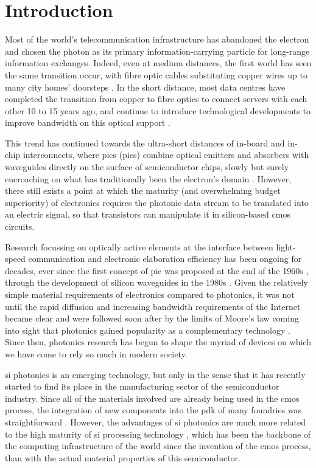 \chapter{Introduction}
\label{chap:introduction}

Most of the world's telecommunication infrastructure has abandoned the electron and chosen the photon as its primary information-carrying particle for long-range information exchanges. Indeed, even at medium distances, the first world has seen the same transition occur, with fibre optic cables substituting copper wires up to many city homes' doorsteps \cite{ECBroadband, ETNOBroadband}. In the short distance, most data centres have completed the transition from copper to fibre optics to connect servers with each other \num{10} to \num{15} years ago, and continue to introduce technological developments to improve bandwidth on this optical support \cite{Cheng2018}. 

This trend has continued towards the ultra-short distances of in-board and in-chip interconnects, where \acl{pic}s (\acs{pic}s) combine optical emitters and absorbers with waveguides directly on the surface of semiconductor chips, slowly but surely encroaching on what has traditionally been the electron's domain \cite{Shekhar2024, Margalit2021, Smit2019}. However, there still exists a point at which the maturity (and overwhelming budget superiority) of electronics requires the photonic data stream to be translated into an electric signal, so that transistors can manipulate it in silicon-based \acf{cmos} circuits. 

Research focussing on optically active elements at the interface between light-speed communication and electronic elaboration efficiency has been ongoing for decades, ever since the first concept of \acs{pic} was proposed at the end of the 1960s \cite{Miller1969}, through the development of silicon waveguides in the 1980s \cite{Soref1987}. Given the relatively simple material requirements of electronics compared to photonics, it was not until the rapid diffusion and increasing bandwidth requirements of the Internet became clear and were followed soon after by the limits of Moore's law coming into sight that photonics gained popularity as a complementary technology \cite{Pathak2019}. Since then, photonics research has begun to shape the myriad of devices on which we have come to rely so much in modern society.

\Acl{si} photonics is an emerging technology, but only in the sense that it has recently started to find its place in the manufacturing sector of the semiconductor industry. Since all of the materials involved are already being used in the \acs{cmos} process, the integration of new components into the \acf{pdk} of many foundries was straightforward \cite{Shi2022, Siew2021, Novack2014}. However, the advantages of \acl{si} photonics are much more related to the high maturity of \acl{si} processing technology \cite{Novack2014}, which has been the backbone of the computing infrastructure of the world since the invention of the \acs{cmos} process, than with the actual material properties of this semiconductor. 

